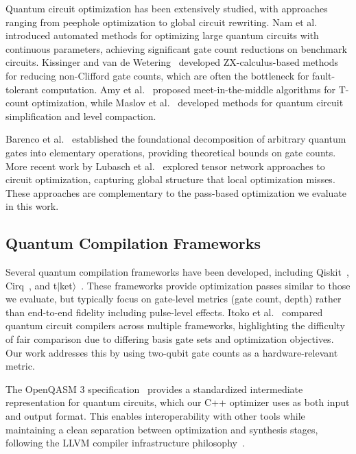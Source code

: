 \documentclass[sigconf,nonacm]{acmart}
\begin{document}
Quantum circuit optimization has been extensively studied, with approaches ranging from peephole optimization to global circuit rewriting. Nam et al.~\cite{nam2018automated} introduced automated methods for optimizing large quantum circuits with continuous parameters, achieving significant gate count reductions on benchmark circuits. Kissinger and van de Wetering~\cite{kissinger2020reducing} developed ZX-calculus-based methods for reducing non-Clifford gate counts, which are often the bottleneck for fault-tolerant computation. Amy et al.~\cite{amy2013meet} proposed meet-in-the-middle algorithms for T-count optimization, while Maslov et al.~\cite{maslov2008quantum} developed methods for quantum circuit simplification and level compaction.

Barenco et al.~\cite{barenco1995elementary} established the foundational decomposition of arbitrary quantum gates into elementary operations, providing theoretical bounds on gate counts. More recent work by Lubasch et al.~\cite{lubasch2025tensor} explored tensor network approaches to circuit optimization, capturing global structure that local optimization misses. These approaches are complementary to the pass-based optimization we evaluate in this work.

\subsection{Quantum Compilation Frameworks}

Several quantum compilation frameworks have been developed, including Qiskit~\cite{qiskit2024}, Cirq~\cite{cirq2024}, and t$|$ket$\rangle$~\cite{sivarajah2020tket}. These frameworks provide optimization passes similar to those we evaluate, but typically focus on gate-level metrics (gate count, depth) rather than end-to-end fidelity including pulse-level effects. Itoko et al.~\cite{itoko2020quantum} compared quantum circuit compilers across multiple frameworks, highlighting the difficulty of fair comparison due to differing basis gate sets and optimization objectives. Our work addresses this by using two-qubit gate counts as a hardware-relevant metric.

The OpenQASM 3 specification~\cite{cross2022openqasm3} provides a standardized intermediate representation for quantum circuits, which our C++ optimizer uses as both input and output format. This enables interoperability with other tools while maintaining a clean separation between optimization and synthesis stages, following the LLVM compiler infrastructure philosophy~\cite{lattner2004llvm}.
\end{document}
